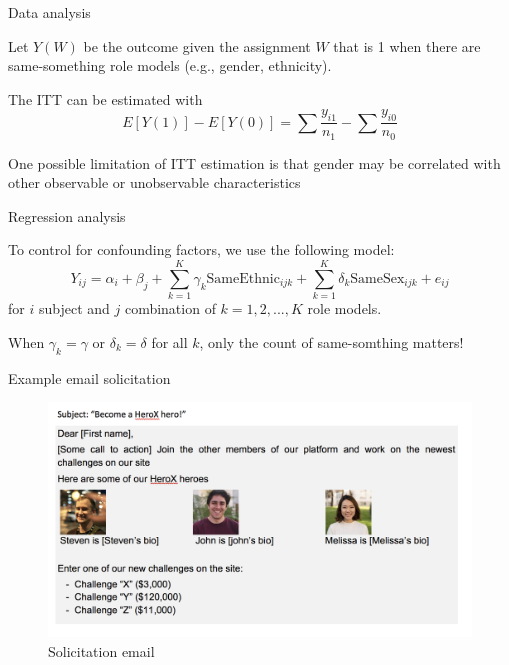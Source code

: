 \begin{frame}{Data analysis}

Let \(Y(W)\) be the outcome given the assignment \(W\) that is 1 when
there are same-something role models (e.g., gender, ethnicity).

The ITT can be estimated with \[
    E[Y(1)] - E[Y(0)] = \sum \frac{y_{i1}}{n_1} - \sum \frac{y_{i0}}{n_0}
\]

One possible limitation of ITT estimation is that gender may be
correlated with other observable or unobservable characteristics

\end{frame}

\begin{frame}{Regression analysis}

To control for confounding factors, we use the following model: \[
    Y_{ij} = \alpha_i + \beta_j + \sum_{k=1}^K \gamma_k\text{SameEthnic}_{ijk} + \sum_{k=1}^K\delta_k\text{SameSex}_{ijk} + e_{ij}
\] for \(i\) subject and \(j\) combination of \(k=1,2,..., K\) role
models.

When \(\gamma_k=\gamma\) or \(\delta_k=\delta\) for all \(k\), only the
count of same-somthing matters!

\end{frame}

\begin{frame}{Example email solicitation}

\begin{figure}
\centering
\includegraphics{solicit_gender_compo.png}
\caption{Solicitation email}
\end{figure}

\end{frame}

